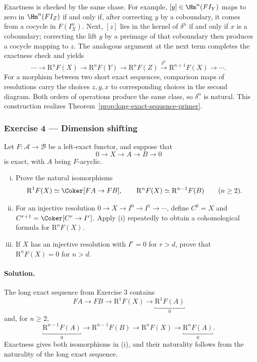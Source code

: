 Exactness is checked by the same chase. For example,
$[y]\in\Hm^n(FI_Y)$ maps to zero in $\Hm^n(FI_Z)$ if and only if, after
correcting $y$ by a coboundary, it comes from a cocycle in $F(I_X^n)$.
Next, $[z]$ lies in the kernel of $\delta^n$ if and only if $x$ is a
coboundary; correcting the lift $y$ by a preimage of that coboundary then
produces a cocycle mapping to $z$. The analogous argument at the next term
completes the exactness check and yields
\[
	\cdots\to\mathrm{R}^nF(X)\to\mathrm{R}^nF(Y)
	\to\mathrm{R}^nF(Z)\xrightarrow{\delta^n}
	\mathrm{R}^{n+1}F(X)\to\cdots.
\]
For a morphism between two short exact sequences, comparison maps of
resolutions carry the choices $z,y,x$ to corresponding choices in the
second diagram. Both orders of operations produce the same class, so
$\delta^n$ is natural. This construction realizes
Theorem~\ref{prop:long-exact-sequence-primer}.

\subsubsection*{Exercise 4 --- Dimension shifting}
\hypertarget{o014.mastery.derived-spectral.002.ex04}{ }
\label{mastery:derived-spectral-002-ex04}

Let $F:\mathcal{A}\to\mathcal{B}$ be a left-exact functor, and suppose
that
\[
	0\longrightarrow X\longrightarrow A\longrightarrow B\longrightarrow0
\]
is exact, with $A$ being $F$-acyclic.
\begin{enumerate}[(i)]
	\item Prove the natural isomorphisms
	\[
		\mathrm{R}^1F(X)\simeq\Coker[FA\to FB],
		\qquad
		\mathrm{R}^nF(X)\simeq\mathrm{R}^{n-1}F(B)\qquad(n\geq2).
	\]
	\item For an injective resolution
	$0\to X\to I^0\to I^1\to\cdots$, define
	$C^0=X$ and $C^{r+1}=\Coker[C^r\to I^r]$. Apply (i) repeatedly to
	obtain a cohomological formula for $\mathrm{R}^nF(X)$.
	\item If $X$ has an injective resolution with $I^r=0$ for $r>d$,
	prove that $\mathrm{R}^nF(X)=0$ for $n>d$.
\end{enumerate}

\paragraph{Solution.}
\hypertarget{o014.mastery.derived-spectral.002.sol04}{ }
The long exact sequence from Exercise 3 contains
\[
	FA\longrightarrow FB\longrightarrow\mathrm{R}^1F(X)
	\longrightarrow\underbracket{\mathrm{R}^1F(A)}_{0}
\]
and, for $n\geq2$,
\[
	\underbracket{\mathrm{R}^{n-1}F(A)}_{0}
	\longrightarrow\mathrm{R}^{n-1}F(B)
	\longrightarrow\mathrm{R}^nF(X)
	\longrightarrow\underbracket{\mathrm{R}^nF(A)}_{0}.
\]
Exactness gives both isomorphisms in (i), and their naturality follows from
the naturality of the long exact sequence.

